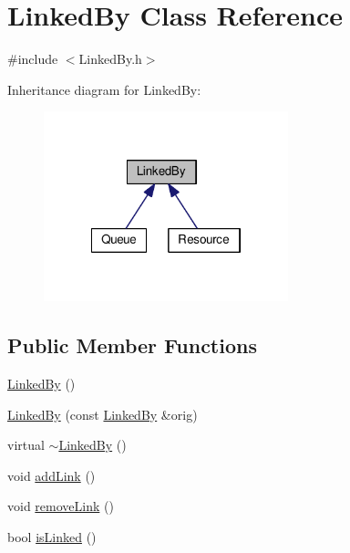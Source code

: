 \hypertarget{class_linked_by}{\section{Linked\-By Class Reference}
\label{class_linked_by}
}


{\ttfamily \#include $<$Linked\-By.\-h$>$}



Inheritance diagram for Linked\-By\-:
\nopagebreak
\begin{figure}[H]
\begin{center}
\leavevmode
\includegraphics[width=201pt]{class_linked_by__inherit__graph}
\end{center}
\end{figure}
\subsection*{Public Member Functions}
\begin{DoxyCompactItemize}
\item 
\hyperlink{class_linked_by_af786842e7d3f98fe43067114dc777b8b}{Linked\-By} ()
\item 
\hyperlink{class_linked_by_ace412273cc6d87ffab7da022c2ae0d65}{Linked\-By} (const \hyperlink{class_linked_by}{Linked\-By} \&orig)
\item 
virtual \hyperlink{class_linked_by_af5c2ee380dcad914ac10cf4132e4a7ae}{$\sim$\-Linked\-By} ()
\item 
void \hyperlink{class_linked_by_afbfa186e0511d6ce2efdb58c89d834c9}{add\-Link} ()
\item 
void \hyperlink{class_linked_by_a2cd33b134ec4bf9043d0bf7e7d4d8f25}{remove\-Link} ()
\item 
bool \hyperlink{class_linked_by_a5f1cd64ec1f6eb15f06d3332071d82b7}{is\-Linked} ()
\end{DoxyCompactItemize}


